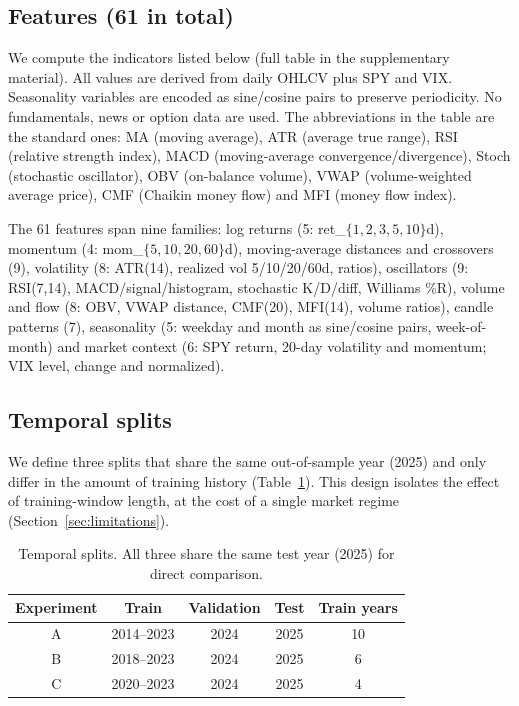 \documentclass[runningheads]{llncs}
\begin{document}
\subsection{Features (61 in total)}

We compute the indicators listed below (full table in the supplementary material). All values are derived from daily OHLCV plus SPY and VIX. Seasonality variables are encoded as sine/cosine pairs to preserve periodicity. No fundamentals, news or option data are used. The abbreviations in the table are the standard ones: MA (moving average), ATR (average true range), RSI (relative strength index), MACD (moving-average convergence/divergence), Stoch (stochastic oscillator), OBV (on-balance volume), VWAP (volume-weighted average price), CMF (Chaikin money flow) and MFI (money flow index).

The 61 features span nine families: log returns (5: ret\_$\{1,2,3,5,10\}$d),
momentum (4: mom\_$\{5,10,20,60\}$d), moving-average distances and crossovers
(9), volatility (8: ATR(14), realized vol 5/10/20/60d, ratios), oscillators (9:
RSI(7,14), MACD/signal/histogram, stochastic K/D/diff, Williams \%R), volume and
flow (8: OBV, VWAP distance, CMF(20), MFI(14), volume ratios), candle patterns
(7), seasonality (5: weekday and month as sine/cosine pairs, week-of-month) and
market context (6: SPY return, 20-day volatility and momentum; VIX level, change
and normalized).

\subsection{Temporal splits}

We define three splits that share the same out-of-sample year (2025) and only differ in the amount of training history (Table~\ref{tab:splits}). This design isolates the effect of training-window length, at the cost of a single market regime (Section~\ref{sec:limitations}).

\begin{table}[htbp]
\centering
\caption{Temporal splits. All three share the same test year (2025) for direct comparison.}
\label{tab:splits}
\begin{tabular}{ccccc}
\toprule
Experiment & Train & Validation & Test & Train years \\
\midrule
A & 2014--2023 & 2024 & 2025 & 10 \\
B & 2018--2023 & 2024 & 2025 & 6 \\
C & 2020--2023 & 2024 & 2025 & 4 \\
\bottomrule
\end{tabular}
\end{table}
\end{document}
